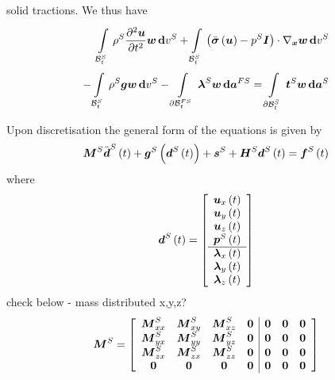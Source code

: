 solid tractions. We thus have
\begin{equation}
  \begin{split}
    \gint{\embedmanifold{B}^{S}_{t}}{}{\rho^{S}\deltwosqby{\vectr{u}}{t}\vectr{w}}{v^{S}}
    +\gint{\embedmanifold{B}^{S}_{t}}{}{\dotprod{\pbrac{\fnof{\bar{\tensor{\sigma}}}{\vectr{u}}-p^{S}\matr{I}}}{\gradient{\vectr{x}}{\vectr{w}}}}{v^{S}} \\
    -\gint{\embedmanifold{B}^{S}_{t}}{}{\rho^{S}\vectr{g}\vectr{w}}{v^{S}}
    -\gint{\boundary{\embedmanifold{B}}^{FS}_{t}}{}{\vectr{\lambda}^{S}\vectr{w}}{\covectr{a}^{FS}}
    =\gint{\boundary{\embedmanifold{B}}^{\bar{S}}_{t}}{}{\vectr{t}^{S}\vectr{w}}{\covectr{a}^{S}}
  \end{split}
\end{equation}

Upon discretisation the general form of the equations is given by
\begin{equation}
  \matr{M}^{S}\fnof{{\ddot{\vectr{d}}}^{S}}{t}+\fnof{\vectr{g}^{S}}{\fnof{\vectr{d}^{S}}{t}}+\vectr{s}^{S}+\matr{H}^{S}\fnof{\vectr{d}^{S}}{t}=\fnof{\vectr{f}^{S}}{t}
\end{equation}
where
\begin{equation}
   \boldsymbol{d}^{S}\left( t \right) =\left[\begin{array}{c}
   \boldsymbol{u}_{x}\left( t \right)  \\
   \boldsymbol{u}_{y}\left( t \right)  \\
   \boldsymbol{u}_{z}\left( t \right)  \\
   \boldsymbol{p}^{S}\left( t \right)  \\ \hline
   \boldsymbol{\lambda}_{x}\left( t \right)  \\
   \boldsymbol{\lambda}_{y}\left( t \right)  \\
   \boldsymbol{\lambda}_{z}\left( t \right)  
  \end{array}\right]
\end{equation}
check below - mass distributed x,y,z?
\begin{equation}
  \matr{M}^{S}=\left[\begin{array}{cccc|ccc}
    \matr{M}^{S}_{xx} & \matr{M}^{S}_{xy} & \matr{M}^{S}_{xz} & \matr{0} & \matr{0} & \matr{0} & \matr{0} \\
    \matr{M}^{S}_{yx} & \matr{M}^{S}_{yy} & \matr{M}^{S}_{yz} & \matr{0} & \matr{0} & \matr{0} & \matr{0} \\
    \matr{M}^{S}_{zx} & \matr{M}^{S}_{zx} & \matr{M}^{S}_{zz} & \matr{0} & \matr{0} & \matr{0} & \matr{0} \\
    \matr{0} & \matr{0} & \matr{0} & \matr{0} & \matr{0} & \matr{0} & \matr{0}
  \end{array}\right]
\end{equation}

